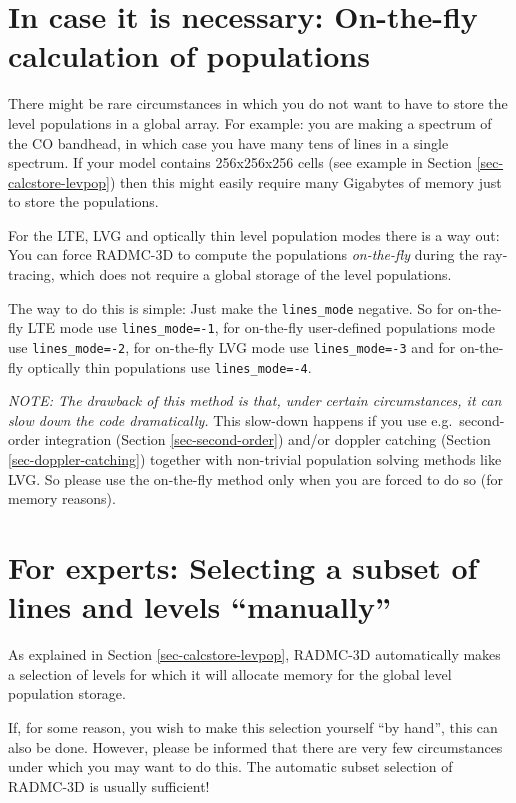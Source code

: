 \documentclass{report}
\begin{document}
\section{In case it is necessary: On-the-fly calculation of populations}
\label{sec-onthefly}
%
There might be rare circumstances in which you do not want to have to store
the level populations in a global array. For example: you are making a spectrum
of the CO bandhead, in which case you have many tens of lines in a single
spectrum. If your model contains 256x256x256 cells (see example in Section
\ref{sec-calcstore-levpop}) then this might easily require many Gigabytes of
memory just to store the populations. 

For the LTE, LVG and optically thin level population modes there is a way
out: You can force RADMC-3D to compute the populations {\em on-the-fly}
during the ray-tracing, which does not require a global storage of the
level populations. 

The way to do this is simple: Just make the {\small\tt lines\_mode}
negative. So for on-the-fly LTE mode use {\small\tt lines\_mode=-1}, for
on-the-fly user-defined populations mode use {\small\tt lines\_mode=-2}, for
on-the-fly LVG mode use {\small\tt lines\_mode=-3} and for on-the-fly
optically thin populations use {\small\tt lines\_mode=-4}.

{\em NOTE: The drawback of this method is that, under certain circumstances,
  it can slow down the code dramatically.} This slow-down happens if you use
e.g.\ second-order integration (Section \ref{sec-second-order}) and/or
doppler catching (Section \ref{sec-doppler-catching}) together with
non-trivial population solving methods like LVG. So please use the
on-the-fly method only when you are forced to do so (for memory reasons).


\section{For experts: Selecting a subset of lines and levels ``manually''}
\label{sec-line-selection}
%
As explained in Section \ref{sec-calcstore-levpop}, RADMC-3D automatically
makes a selection of levels for which it will allocate memory for the global
level population storage. 

If, for some reason, you wish to make this selection yourself ``by hand'',
this can also be done. However, please be informed that there are very
few circumstances under which you may want to do this. The automatic
subset selection of RADMC-3D is usually sufficient!
\end{document}
